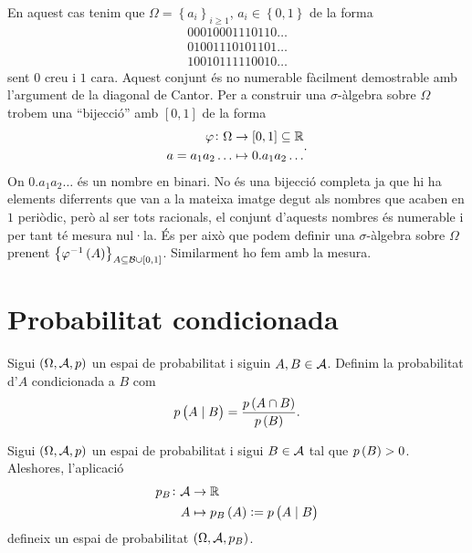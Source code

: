 \begin{example}
\begin{enumerate}
     En aquest cas tenim que $\Omega = \left\{a_i\right\}_{i\geq1}$, $a_i \in \left\{0,1\right\}$ de la forma
     \begin{gather*}
	00010001110110\dots \\
	01001110101101\dots \\
	10010111110010\dots 
     \end{gather*}
      sent $0$ creu i $1$ cara. Aquest conjunt és no numerable fàcilment demostrable amb l'argument de la diagonal de Cantor.
      Per a construir una $\sigma$-àlgebra sobre $\Omega$ trobem una ``bijecció'' amb $\left[0,1\right]$ de la forma
      \[
        \begin{aligned}
            \varphi\colon\Omega &\to [0,1]\subseteq\mathbb{R} \\
            a=a_1a_2\dots &\mapsto 0.a_1a_2\dots
        \end{aligned}.
      \]
      On $0.a_1a_2\dots$ és un nombre en binari. No és una bijecció completa ja que hi ha elements diferrents que van
      a la mateixa imatge degut als nombres que acaben en $1$ periòdic, però al ser tots racionals,
      el conjunt d'aquests nombres és numerable i per tant té mesura nul·la. És per això que podem definir una $\sigma$-àlgebra sobre $\Omega$ prenent 
      $\left\{\varphi^{-1}\left( A\right) \right\}_{A\subseteq \mathcal{B}\cup[0,1]}$. Similarment ho fem amb la mesura.
    \end{enumerate}
\end{example}


\section{Probabilitat condicionada}

\begin{defi}
    Sigui $\left( \Omega, \mathcal{A}, p\right)$ un espai de probabilitat i siguin $A, B \in \mathcal{A}$. Definim la probabilitat d'$A$ condicionada a $B$ com
    \[
        p\left( A\mid B\right) = \frac{p\left( A\cap B\right)}{p\left( B\right)}.
    \]
\end{defi}

\begin{obs}
    Sigui $\left( \Omega, \mathcal{A}, p\right)$ un espai de probabilitat i sigui $B \in \mathcal{A}$ tal que $p\left( B\right) > 0$. Aleshores, l'aplicació
    \begin{align*}
        p_B\colon \mathcal{A} &\to \mathbb{R} \\
        A &\mapsto p_B\left( A\right) := p\left( A\mid B\right)
    \end{align*}
    defineix un espai de probabilitat $\left( \Omega, \mathcal{A}, p_B\right)$.
\end{obs}

